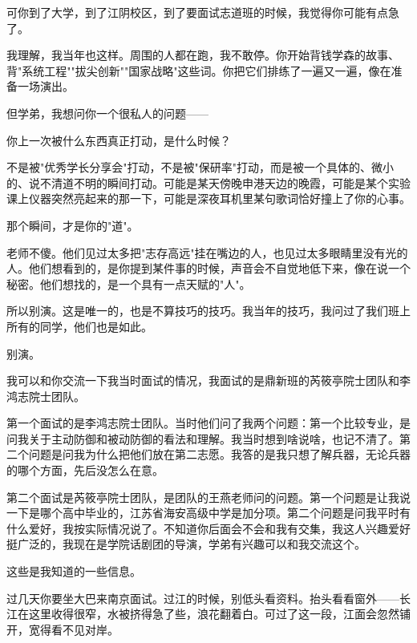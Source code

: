 \documentclass[12pt,a4paper]{article}
\begin{document}
可你到了大学，到了江阴校区，到了要面试志道班的时候，我觉得你可能有点急了。\par

我理解，我当年也这样。周围的人都在跑，我不敢停。你开始背钱学森的故事、背"系统工程""拔尖创新""国家战略"这些词。你把它们排练了一遍又一遍，像在准备一场演出。\par

但学弟，我想问你一个很私人的问题——\par

你上一次被什么东西真正打动，是什么时候？\par

不是被"优秀学长分享会"打动，不是被"保研率"打动，而是被一个具体的、微小的、说不清道不明的瞬间打动。可能是某天傍晚申港天边的晚霞，可能是某个实验课上仪器突然亮起来的那一下，可能是深夜耳机里某句歌词恰好撞上了你的心事。\par

那个瞬间，才是你的"道"。\par

老师不傻。他们见过太多把"志存高远"挂在嘴边的人，也见过太多眼睛里没有光的人。他们想看到的，是你提到某件事的时候，声音会不自觉地低下来，像在说一个秘密。他们想找的，是一个具有一点天赋的"人"。\par

所以别演。这是唯一的，也是不算技巧的技巧。我当年的技巧，我问过了我们班上所有的同学，他们也是如此。\par

别演。\par

我可以和你交流一下我当时面试的情况，我面试的是鼎新班的芮筱亭院士团队和李鸿志院士团队。\par

第一个面试的是李鸿志院士团队。当时他们问了我两个问题：第一个比较专业，是问我关于主动防御和被动防御的看法和理解。我当时想到啥说啥，也记不清了。第二个问题是问我为什么把他们放在第二志愿。我答的是我只想了解兵器，无论兵器的哪个方面，先后没怎么在意。\par

第二个面试是芮筱亭院士团队，是团队的王燕老师问的问题。第一个问题是让我说一下是哪个高中毕业的，江苏省海安高级中学是加分项。第二个问题是问我平时有什么爱好，我按实际情况说了。不知道你后面会不会和我有交集，我这人兴趣爱好挺广泛的，我现在是学院话剧团的导演，学弟有兴趣可以和我交流这个。\par

这些是我知道的一些信息。\par

过几天你要坐大巴来南京面试。过江的时候，别低头看资料。抬头看看窗外——长江在这里收得很窄，水被挤得急了些，浪花翻着白。可过了这一段，江面会忽然铺开，宽得看不见对岸。\par
\end{document}
